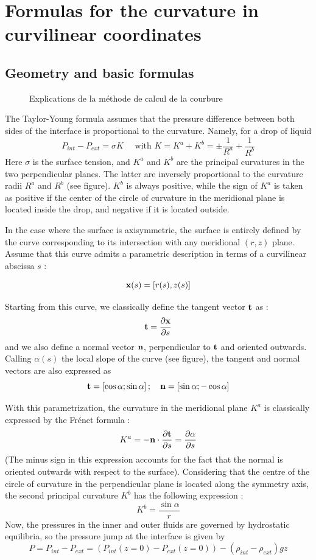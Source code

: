 \documentclass{jfm}
\newcommand\be{\begin{equation}}
\newcommand\ee{\end{equation}}
\newcommand\DP[2]{\frac{\partial #1}{\partial #2}}
\begin{document}
\section{Formulas for the curvature in curvilinear coordinates}

\subsection{Geometry and basic formulas}

\begin{figure}
\begin{center}

\end{center}
\caption{Explications de la méthode de calcul de la courbure}
\end{figure}



The Taylor-Young formula assumes that the pressure difference between both sides of the interface
is proportional to the curvature. Namely, for a drop of liquid 
\be
P_{int} - P_{ext} = \sigma K \quad \mbox{ with } K = K^a + K^b = \pm \frac{1}{R^a}+\frac{1}{R^b} 
\ee
Here $\sigma$ is the surface tension, and $K^a$ and $K^b$ are the principal curvatures 
in the two perpendicular planes. The latter are inversely proportional to the curvature radii $R^a$ and $R^b$ (see figure). $K^b$ is always positive, while the sign of $K^a$ is taken as positive if the center of the circle of curvature in the meridional plane is located inside the drop, and negative if it is located outside.

In the case where the surface is axisymmetric, the surface is entirely defined by the curve corresponding to its intersection with any meridional $(r,z)$ plane. Assume that this curve admits a parametric description in terms of a curvilinear abscissa $s$ :

\be
{\bf x} (s) = [r(s), z(s)]
\ee

Starting from this curve, we classically define the tangent vector ${\bf  t}$ as :
\be
{\bf t} = \DP{{\bf x}}{s}
\ee
and we also define a normal vector ${\bf  n}$, perpendicular to ${\bf  t}$ and oriented outwards.
Calling $\alpha(s)$ the local slope of the curve (see figure), the tangent and normal vectors are also expressed as 
 \be
{\bf t}  = [ \cos \alpha ; \sin \alpha] \, ; \quad {\bf n}  = [ \sin \alpha ; - \cos \alpha] 
\ee

With this parametrization, the curvature in the meridional plane $K^a$ is classically expressed by the Fr{\'e}net formula :
 \be
K^a = - {\bf n}  \cdot \DP{\bf t}{s} = \DP{\alpha}{s}
\ee
(The minus sign in this expression accounts for the fact that the normal is oriented outwards with respect to the surface).  Considering that the centre of the circle of curvature in the perpendicular plane is located along the symmetry axis, the second principal curvature $K^b$ has the following expression : 
\be
K^b = \frac{\sin \alpha}{r} 
\ee
Now, the pressures in the inner and outer fluids are governed by hydrostatic equilibria, so the pressure jump at the interface is given by
\be
P = P_{int} - P_{ext} = \left( P_{int}(z=0) - P_{ext}(z=0) \right)  - (\rho_{int} - \rho_{ext}) g z 
\ee
\end{document}
